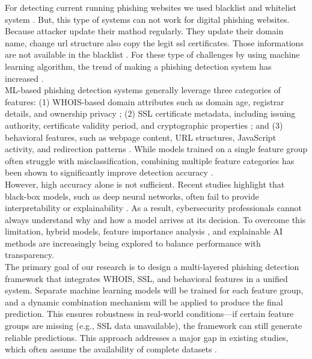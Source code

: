 \documentclass[conference]{IEEEtran}
\begin{document}
For detecting current running phishing websites we used blacklist and whitelist system \cite{academia2022mlphishing}. But, this type of systems can not work for digital phishing websites. Because attacker update their mathod regularly. They update their domain name, change url structure also copy the legit ssl certificates. Those informations are not available in the blacklist \cite{sciencedirect2022noveldataset}. For these type of challenges by using machine learning algorithm, the trend of making a phishing detection system has increased \cite{mdpi2022improved, academia2020cnn}. \\ 

ML-based phishing detection systems generally leverage three categories of features: (1) WHOIS-based domain attributes such as domain age, registrar details, and ownership privacy \cite{academia2024survey}; (2) SSL certificate metadata, including issuing authority, certificate validity period, and cryptographic properties \cite{mdpi2023deeplearning}; and (3) behavioral features, such as webpage content, URL structures, JavaScript activity, and redirection patterns \cite{futureinternet2022behavior}. While models trained on a single feature group often struggle with misclassification, combining multiple feature categories has been shown to significantly improve detection accuracy \cite{frontiers2025multimodal}. \\

However, high accuracy alone is not sufficient. Recent studies highlight that black-box models, such as deep neural networks, often fail to provide interpretability or explainability \cite{wiley2022explainable}. As a result, cybersecurity professionals cannot always understand why and how a model arrives at its decision. To overcome this limitation, hybrid models, feature importance analysis \cite{arxiv2024featureimportance}, and explainable AI methods are increasingly being explored to balance performance with transparency. \\

The primary goal of our research is to design a multi-layered phishing detection framework that integrates WHOIS, SSL, and behavioral features in a unified system. Separate machine learning models will be trained for each feature group, and a dynamic combination mechanism will be applied to produce the final prediction. This ensures robustness in real-world conditions—if certain feature groups are missing (e.g., SSL data unavailable), the framework can still generate reliable predictions. This approach addresses a major gap in existing studies, which often assume the availability of complete datasets \cite{academia2021urltran, irep2025benchmarking}. \\
\end{document}
